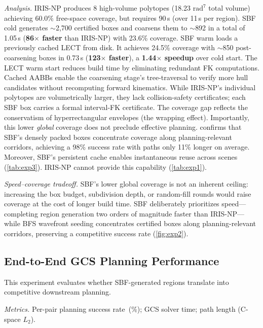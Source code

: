 \documentclass[letterpaper, conference]{IEEEtran}
\begin{document}
\emph{Analysis.}
IRIS-NP produces 8 high-volume polytopes (18.23 $\text{rad}^7$ total volume)
achieving 60.0\% free-space coverage, but requires 90\,s (over
11\,s per region).
SBF cold generates ${\sim}$2{,}700 certified boxes and coarsens them to
${\sim}$892 in a total of 1.05\,s (\textbf{86$\times$ faster} than IRIS-NP)
with 23.6\% coverage.
SBF warm loads a previously cached LECT from disk.
It achieves 24.5\% coverage with ${\sim}$850 post-coarsening boxes in
0.73\,s (\textbf{123$\times$ faster}), a \textbf{1.44$\times$ speedup}
over cold start.
The LECT warm start reduces build time by eliminating redundant FK
computations.
Cached AABBs enable the coarsening stage's tree-traversal to verify
more hull candidates without recomputing forward kinematics.
While IRIS-NP's individual polytopes are volumetrically larger,
they lack collision-safety certificates;
each SBF box carries a formal interval-FK certificate.
The coverage gap reflects the conservatism of hyperrectangular envelopes
(the wrapping effect).
Importantly, this lower \emph{global} coverage does not preclude
effective planning.
 confirms that SBF's densely packed boxes concentrate
coverage along planning-relevant corridors,
achieving a 98\% success rate with paths only 11\% longer on average.
Moreover, SBF's persistent cache enables instantaneous reuse across
scenes (\cref{tab:exp3}).
IRIS-NP cannot provide this capability
(\cref{tab:exp1}).

\emph{Speed--coverage tradeoff.}
SBF's lower global coverage is not an inherent ceiling:
increasing the box budget, subdivision depth, or random-fill rounds
would raise coverage at the cost of longer build time.
SBF deliberately prioritizes speed---completing region generation
two orders of magnitude faster than IRIS-NP---while
BFS wavefront seeding concentrates certified boxes along
planning-relevant corridors, preserving a competitive success rate
(\cref{fig:exp2}).



\subsection{End-to-End GCS Planning Performance}\label{sec:exp2}

This experiment evaluates whether SBF-generated regions translate into
competitive downstream planning.

\emph{Metrics.}
Per-pair planning success rate~(\%);
GCS solver time;
path length (C-space $L_2$).
\end{document}
